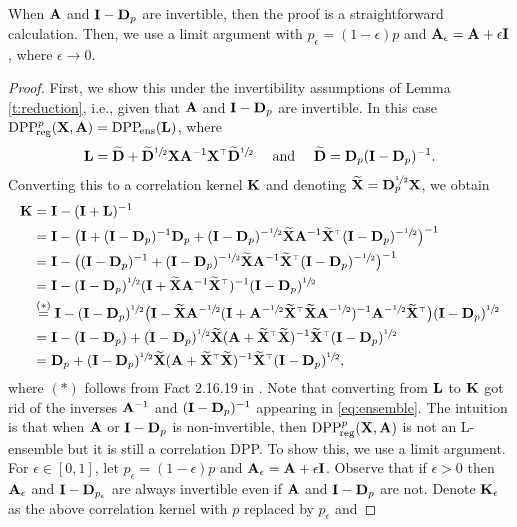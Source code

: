 \documentclass[../../thesis.tex]{subfiles}
\begin{document}
When $\mathbf A$ and $\mathbf I-\mathbf D_p$ are invertible, then the proof is a
straightforward calculation.
Then, we use a limit argument with $p_\epsilon=(1-\epsilon)p$ and
$\mathbf A_\epsilon=\mathbf A+\epsilon\mathbf I$, where $\epsilon\rightarrow 0$.

\begin{proof}
  First, we show this under the invertibility assumptions of Lemma
  \ref{t:reduction}, i.e., given that $\mathbf A$ and $\mathbf I-\mathbf D_p$ are
  invertible. In this case ${{\mathrm{DPP}}_{\!\mathrm{reg}}^{p}}(\mathbf X,\mathbf A)={{\mathrm{DPP}}_{\!\mathrm{ens}}}(\mathbf{L})$, where
  \begin{align}\L=\Dbt+
    \Dbt^{\sfrac12}\X\A^{-1}\X^\top
    \Dbt^{\sfrac12}\quad\text{ and }\quad\Dbt=\D_p(\I-\D_p)^{-1}.\label{eq:ensemble}
  \end{align}
  Converting this to
  a correlation kernel $\mathbf K$ and denoting $\widetilde{\mathbf{X}}=\mathbf D_p^{\sfrac12}\mathbf X$, we obtain
  \begin{align*}
    \K & =\I-(\I+\L)^{-1}
    \\      &=\I - \big(\I + (\I-\D_p)^{-1}\D_p +
    (\I-\D_p)^{-\sfrac12}\Xt\A^{-1}\Xt^\top(\I-\D_p)^{-\sfrac12}\big)^{-1}
    \\ &= \I - \big((\I-\D_p)^{-1} +
    (\I-\D_p)^{-\sfrac12}\Xt\A^{-1}\Xt^\top(\I-\D_p)^{-\sfrac12}\big)^{-1}
    \\ &=\I -
    (\I-\D_p)^{\sfrac12}(\I+\Xt\A^{-1}\Xt^\top)^{-1}(\I-\D_p)^{\sfrac12}
    \\
       & \overset{(*)}{=}\I -
    (\I-\D_p)^{\sfrac12}\big(\I-\Xt\A^{-\sfrac12}
    (\I+\A^{-\sfrac12}\Xt^\top\Xt\A^{-\sfrac12})^{-1}
    \A^{-\sfrac12}\Xt^\top\big)(\I-\D_p)^{\sfrac12}
    \\
       & =\I - (\I-\D_p) +
    (\I-\D_p)^{\sfrac12}\Xt(\A+\Xt^\top\Xt)^{-1}\Xt^\top(\I-\D_p)^{\sfrac12}
    \\ &=\D_p + (\I-\D_p)^{\sfrac12}\Xt(\A+\Xt^\top\Xt)^{-1}\Xt^\top(\I-\D_p)^{\sfrac12},
  \end{align*}
  where $(*)$ follows from Fact 2.16.19 in
  \cite{matrix-mathematics}. Note that converting from $\mathbf{L}$ to $\mathbf K$
  got rid of the inverses $\mathbf A^{-1}$  and $(\mathbf I-\mathbf D_p)^{-1}$ appearing
  in \eqref{eq:ensemble}. The intuition
  is that when $\mathbf A$ or $\mathbf I-\mathbf D_p$ is non-invertible, then
  ${{\mathrm{DPP}}_{\!\mathrm{reg}}^{p}}(\mathbf X,\mathbf A)$ is not an L-ensemble but it is still a
  correlation DPP. To show this, we use a limit argument. For
  $\epsilon\in[0,1]$, let $p_\epsilon=(1-\epsilon)p$ and
  $\mathbf A_\epsilon=\mathbf A+\epsilon\mathbf I$. Observe that if $\epsilon>0$ then $\mathbf A_\epsilon$ and
  $\mathbf I-\mathbf D_{p_{\epsilon}}$ are always invertible even if $\mathbf A$ and
  $\mathbf I-\mathbf D_p$ are not. Denote $\mathbf K_\epsilon$ as the
  above correlation kernel with $p$ replaced by $p_{\epsilon}$ and

\end{proof}
\end{document}
